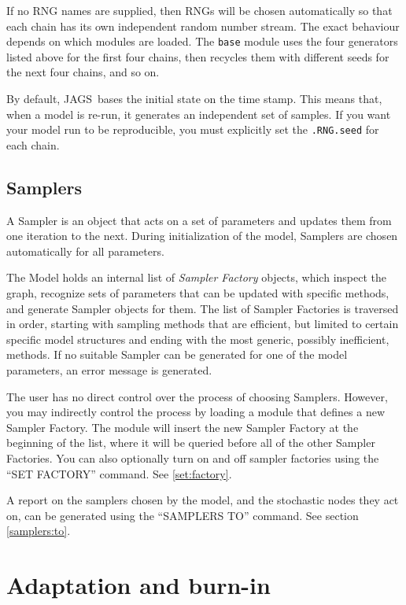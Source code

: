\documentclass[11pt, a4paper, titlepage]{report}
\newcommand{\JAGS}{\textsf{JAGS}}
\begin{document}
If no RNG names are supplied, then RNGs will be chosen automatically
so that each chain has its own independent random number stream.  The
exact behaviour depends on which modules are loaded. The \texttt{base}
module uses the four generators listed above for the first four
chains, then recycles them with different seeds for the next four
chains, and so on.  

By default, \JAGS\ bases the initial state on the time stamp. This
means that, when a model is re-run, it generates an independent set of
samples. If you want your model run to be reproducible, you must
explicitly set the \verb+.RNG.seed+ for each chain.

\subsection{Samplers}

A Sampler is an object that acts on a set of parameters and updates
them from one iteration to the next. During initialization of the
model, Samplers are chosen automatically for all parameters. 

The Model holds an internal list of {\em Sampler Factory} objects,
which inspect the graph, recognize sets of parameters that can be
updated with specific methods, and generate Sampler objects for
them. The list of Sampler Factories is traversed in order, starting with
sampling methods that are efficient, but limited to certain specific
model structures and ending with the most generic, possibly
inefficient, methods. If no suitable Sampler can be generated for one
of the model parameters, an error message is generated.

The user has no direct control over the process of choosing
Samplers. However, you may indirectly control the process by loading a
module that defines a new Sampler Factory. The module will insert the
new Sampler Factory at the beginning of the list, where it will be
queried before all of the other Sampler Factories. You can also 
optionally turn on and off sampler factories using the ``SET FACTORY''
command. See \ref{set:factory}.

A report on the samplers chosen by the model, and the stochastic nodes
they act on, can be generated using the ``SAMPLERS TO'' command. See 
section \ref{samplers:to}.
 
\section{Adaptation and burn-in}
\end{document}
